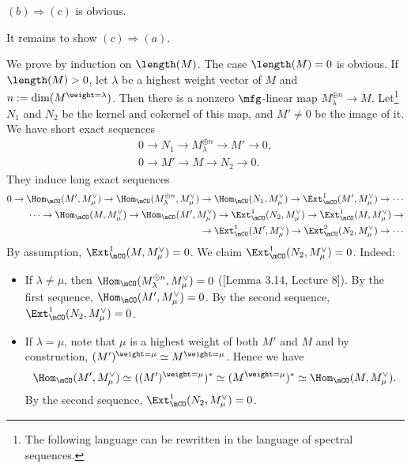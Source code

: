 		$(b)\Rightarrow (c)$ is obvious.

		It remains to show $(c)\Rightarrow (a)$. 

		We prove by induction on $\length(M)$. The case $\length(M)=0$ is obvious. If $\length(M)>0$, let $\lambda$ be a highest weight vector of $M$ and $n:=\dim(M^{\weight = \lambda})$. Then there is a nonzero $\mfg$-linear map $ M_\lambda ^{\oplus n} \to M $. Let\footnote{The following language can be rewritten in the language of spectral sequences.} $N_1$ and $N_2$ be the kernel and cokernel of this map, and $M'\neq 0$ be the image of it. We have short exact sequences
		\[
			\begin{aligned}
				0 \to N_1 \to M_\lambda ^{\oplus n} \to M' \to 0 ,\\
				0 \to M' \to M \to N_2 \to 0.
			\end{aligned}
		\]
		They induce long exact sequences
		\[
			\begin{aligned}
				0 \to \Hom_\mCO(M', M_\mu^\vee  ) \to  \Hom_\mCO( M_\lambda ^{\oplus n}, M_\mu^\vee  ) \to  \Hom_\mCO( N_1, M_\mu^\vee  ) \to \Ext_\mCO^1(M', M_\mu^\vee  ) \to\cdots \\
				\cdots  \to \Hom_\mCO( M , M_\mu^\vee )  \to \Hom_\mCO( M' , M_\mu^\vee ) \to \Ext_\mCO^1( N_2 , M_\mu^\vee ) \to \Ext_\mCO^1( M , M_\mu^\vee ) \to \\
				\to \Ext_\mCO^1( M' , M_\mu^\vee ) \to \Ext_\mCO^2( N_2 , M_\mu^\vee ) \to \cdots
			\end{aligned}
		\]
		By assumption, $\Ext_\mCO^1( M , M_\mu^\vee )=0$. We claim $\Ext_\mCO^1( N_2 , M_\mu^\vee )=0$. Indeed:
		\begin{itemize}
			\item 
				If $\lambda\neq \mu$, then $ \Hom_\mCO( M_\lambda ^{\oplus n}, M_\mu^\vee  )=0$ ([Lemma 3.14, Lecture 8]). By the first sequence, $ \Hom_\mCO(M', M_\mu^\vee  ) =0$. By the second sequence, $\Ext_\mCO^1( N_2 , M_\mu^\vee )=0$. 
			\item
				If $\lambda = \mu$, note that $\mu$ is a highest weight of both $M'$ and $M$ and by construction, $(M')^{\weight=\mu} \simeq M^{\weight = \mu}$. Hence we have
				\[
					\Hom_\mCO(M', M_\mu^\vee  ) \simeq ((M')^{\weight=\mu})^* \simeq (M^{\weight = \mu})^* \simeq \Hom_\mCO(M, M_\mu^\vee  ) .
				\]
				By the second sequence, $\Ext_\mCO^1( N_2 , M_\mu^\vee )=0$. 
		\end{itemize}


